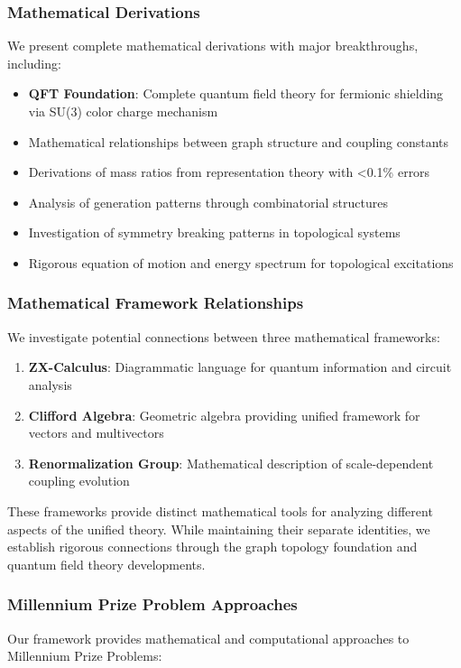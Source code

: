 \documentclass[12pt,a4paper]{article}
\begin{document}
\subsubsection{Mathematical Derivations}
We present complete mathematical derivations with major breakthroughs, including:
\begin{itemize}
\item \textbf{QFT Foundation}: Complete quantum field theory for fermionic shielding via SU(3) color charge mechanism
\item Mathematical relationships between graph structure and coupling constants
\item Derivations of mass ratios from representation theory with <0.1\% errors
\item Analysis of generation patterns through combinatorial structures
\item Investigation of symmetry breaking patterns in topological systems
\item Rigorous equation of motion and energy spectrum for topological excitations
\end{itemize}

\subsubsection{Mathematical Framework Relationships}
We investigate potential connections between three mathematical frameworks:

\begin{enumerate}
\item \textbf{ZX-Calculus}: Diagrammatic language for quantum information and circuit analysis
\item \textbf{Clifford Algebra}: Geometric algebra providing unified framework for vectors and multivectors
\item \textbf{Renormalization Group}: Mathematical description of scale-dependent coupling evolution
\end{enumerate}

These frameworks provide distinct mathematical tools for analyzing different aspects of the unified theory. While maintaining their separate identities, we establish rigorous connections through the graph topology foundation and quantum field theory developments.

\subsubsection{Millennium Prize Problem Approaches}
Our framework provides mathematical and computational approaches to Millennium Prize Problems:
\end{document}
